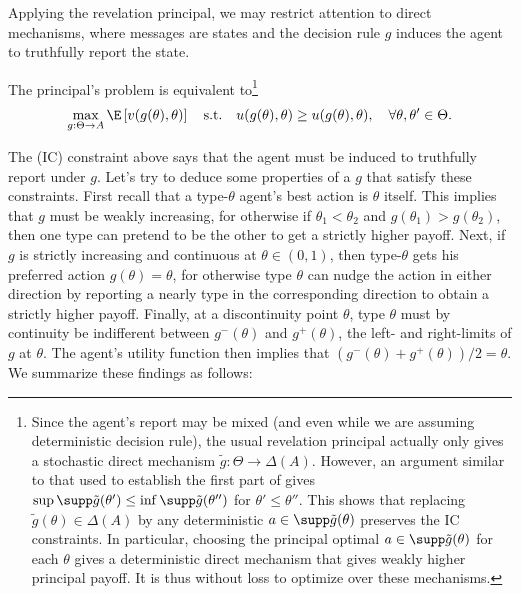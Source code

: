 Applying the revelation principal, we may restrict attention to direct mechanisms, where messages are states and the decision rule \(g\) induces the agent to truthfully report the state.
\begin{lemma}\label{lem:delegation-direct-mech}
  The principal's problem is equivalent to\footnote{
Since the agent's report may be mixed (and even while we are assuming deterministic decision rule), the usual revelation principal actually only gives a stochastic direct mechanism \(\tilde{g}: \Theta \to \Delta(A)\).
  However, an argument similar to that used to establish the first part of  gives \(\sup \supp \tilde{g}(\theta') \leq \inf \supp \tilde{g}(\theta'')\) for \(\theta' \leq \theta''\).
  This shows that replacing \(\tilde{g}(\theta) \in \Delta(A)\) by any deterministic \(a \in \supp \tilde{g}(\theta)\) preserves the IC constraints.
  In particular, choosing the principal optimal \(a \in \supp \tilde{g}(\theta)\) for each \(\theta\) gives a deterministic direct mechanism that gives weakly higher principal payoff.
  It is thus without loss to optimize over these mechanisms.
}
  \[
    \max_{g: \Theta \to A} \E\left[ v(g(\theta), \theta) \right]
    \quad\text{s.t.}\quad
    u(g(\theta), \theta) \geq u(g(\theta), \theta), \quad \forall \theta, \theta' \in \Theta.
  \]
\end{lemma}

The  (IC) constraint above says that the agent must be induced to truthfully report under \(g\).
Let's try to deduce some properties of a \(g\) that satisfy these constraints.
First recall that a type-\(\theta\) agent's best action is \(\theta\) itself.
This implies that \(g\) must be weakly increasing, for otherwise if \(\theta_1 < \theta_2\) and \(g(\theta_1) > g(\theta_2)\), then one type can pretend to be the other to get a strictly higher payoff.
Next, if \(g\) is strictly increasing and continuous at \(\theta \in (0, 1)\), then type-\(\theta\) gets his preferred action \(g(\theta) = \theta\), for otherwise type \(\theta\) can nudge the action in either direction by reporting a nearly type in the corresponding direction to obtain a strictly higher payoff.
Finally, at a discontinuity point \(\theta\), type \(\theta\) must by continuity be indifferent between \(g^-(\theta)\) and \(g^+(\theta)\), the left- and right-limits of \(g\) at \(\theta\).
The agent's utility function then implies that \((g^-(\theta) + g^+(\theta)) / 2 = \theta\).
We summarize these findings as follows:

